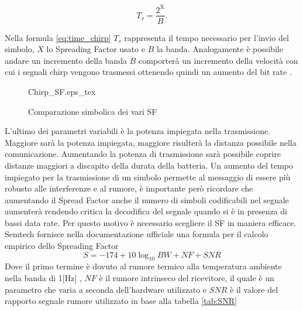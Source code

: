 \begin{equation}\label{eq:time_chirp}
        T_s=\frac{2^{\text{X}}}{B}.
\end{equation}

Nella formula \ref{eq:time_chirp} $T_s$ rappresenta il tempo necessario per
l'invio del simbolo, $X$ lo Spreading Factor usato e $B$ la banda.
Analogamente è possibile andare un incremento della banda $B$ comporterà un
incremento della velocità con cui i segnali chirp vengono trasmessi ottenendo
quindi un aumento del bit rate .

\begin{figure}[h]
        \centering 
        {Chirp_SF.eps_tex}
                \caption{Comparazione simbolica dei vari SF}
        \label{fig:sf_var}
\end{figure}
L'ultimo dei parametri variabili è la potenza impiegata nella trasmissione.
Maggiore sarà la potenza impiegata, maggiore risulterà la distanza possibile
nella comunicazione.
Aumentando la potenza di trasmissione sarà possibile coprire distanze maggiori a
discapito della durata della batteria.
Un aumento del tempo impiegato per la trasmissione di un simbolo permette al
messaggio di essere più robusto alle interferenze e al rumore, è importante però
ricordare che aumentando il Spread Factor anche il numero di simboli codificabili nel
segnale  aumenterà rendendo critica la decodifica del segnale quando si è in
presenza di bassi data rate. Per questo motivo è necessario scegliere il SF in
maniera efficace. Semtech fornisce nella documentazione ufficiale una formula
per il calcolo empirico dello Spreading Factor  
\begin{equation}
        S = -174+10\log_{10}BW + NF + SNR
\end{equation}
Dove il primo termine è dovuto al rumore termico alla temperatura ambiente nella
banda di 1[Hz] , $NF$ è il rumore intrinseco del ricevitore, il
quale è un parametro che varia  a seconda  dell'hardware utilizzato e 
$SNR$ è il valore del rapporto segnale rumore utilizzato in base alla tabella \ref{tab:SNR}

